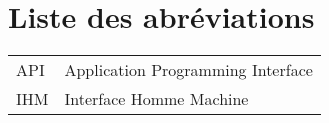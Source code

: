 \chapter*{Liste des abréviations}
\lhead{}

\begin{tabular}{ll}
API & Application Programming Interface \\
IHM & Interface Homme Machine
\end{tabular}